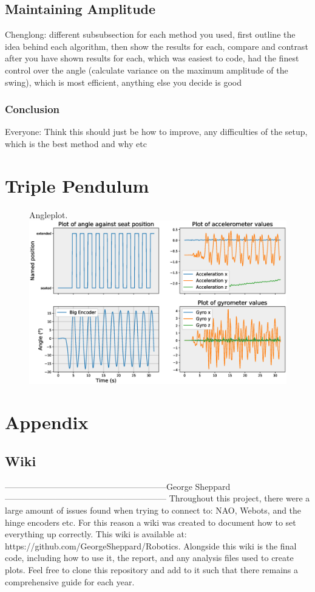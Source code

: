\documentclass[11pt]{article}
\begin{document}
\subsection{Maintaining Amplitude}
Chenglong: different subsubsection for each method you used, first outline the idea behind each algorithm, then show the results for each, compare and contrast after you have shown results for each, which was easiest to code, had the finest control over the angle (calculate variance on the maximum amplitude of the swing), which is most efficient, anything else you decide is good

\subsubsection{Conclusion}
Everyone: Think this should just be how to improve, any difficulties of the setup, which is the best method and why etc

\section{Triple Pendulum}

\begin{figure}[!htb]
    \centering
    \captionbox
         {Angleplot.\label{angleplot}}
         {\includegraphics[width=1.0\textwidth]{AnglePlot15-02-201913:29:23}}
\end{figure}

\appendix
\section{Appendix}
\subsection{Wiki}
---------------------------------------------------------George Sheppard---------------------------------------------------------
Throughout this project, there were a large amount of issues found when trying to connect to: NAO, Webots, and the hinge encoders etc. For this reason a wiki was created to document how to set everything up correctly. This wiki is available at: https://github.com/GeorgeSheppard/Robotics. Alongside this wiki is the final code, including how to use it, the report, and any analysis files used to create plots. Feel free to clone this repository and add to it such that there remains a comprehensive guide for each year.



\end{document}
